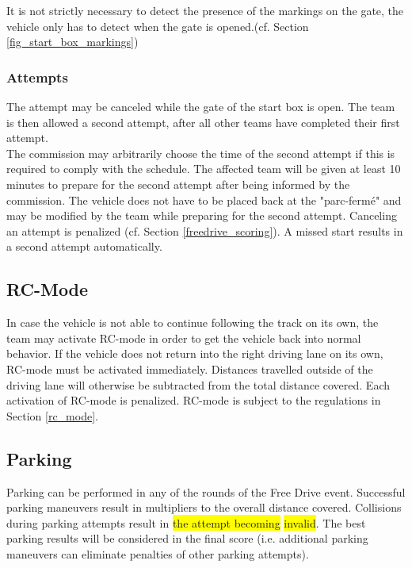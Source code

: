 It is not strictly necessary to detect the presence of the markings on the
gate, the vehicle only has to detect when the gate is opened.(cf. Section
\ref{fig_start_box_markings})

\subsubsection{Attempts}

The attempt may be canceled while the gate of the start box is open. The team
is then allowed a second attempt, after all other teams have completed their
first attempt.\\ The commission may arbitrarily choose the time of the second
attempt if this is required to comply with the schedule. The affected team will
be given at least 10 minutes to prepare for the second attempt after being
informed by the commission. The vehicle does not have to be placed back at the
"parc-fermé" and may be modified by the team while preparing for the second
attempt. Canceling an attempt is penalized (cf. Section
\ref{freedrive_scoring}). A missed start results in a second attempt
automatically.

\subsection{RC-Mode}

In case the vehicle is not able to continue following the track on its own, the
team may activate RC-mode in order to get the vehicle back into normal
behavior. If the vehicle does not return into the right driving lane on its
own, RC-mode must be activated immediately. Distances travelled outside of the
driving lane will otherwise be subtracted from the total distance covered. Each
activation of RC-mode is penalized. RC-mode is subject to the regulations in
Section \ref{rc_mode}.

\subsection{Parking}

Parking can be performed in any of the rounds of the Free Drive event.
Successful parking maneuvers result in multipliers to the overall distance
covered. Collisions during parking attempts result in \colorbox{yellow}{the attempt 
becoming} \colorbox{yellow}{invalid}. The best parking results will be considered 
in the final score (i.e. additional parking maneuvers can eliminate penalties of 
other parking attempts).

